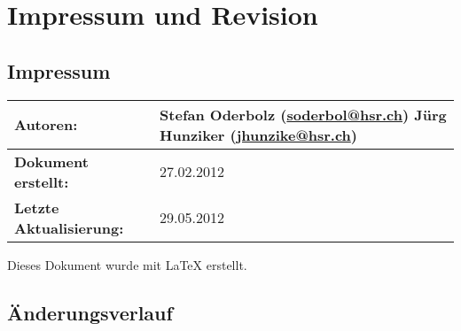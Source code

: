 \chapter*{Impressum und Revision}

\section*{Impressum}
\begin{longtable}{|p{0.35\twocelltabwidth}|p{0.65\twocelltabwidth}|}
\hline 
\textbf{Autoren:} & Stefan Oderbolz (\url{soderbol@hsr.ch}) \newline
Jürg Hunziker (\url{jhunzike@hsr.ch}) \\ 
\hline 
\textbf{Dokument erstellt:} & 27.02.2012 \\ 
\hline 
\textbf{Letzte Aktualisierung:} & 29.05.2012 \\ 
\hline 
\end{longtable}

Dieses Dokument wurde mit \LaTeX{} erstellt.

\section*{Änderungsverlauf}

